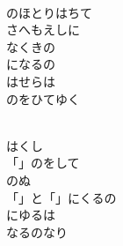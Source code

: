 \documentclass[10pt,b5j]{tarticle} %
\begin{document}
\begin{enumerate}
\begin{minipage}[c]{\blocksize}
    \end{minipage}
    \begin{minipage}[c]{\blocksize}
        
        \vspace{\linespace}
        \item~\\
        のほとりはちて\\
        さへもえしに\\
        なくきの\\
        になるの\\
        はせらは\\
        のをひてゆく
        
    \end{minipage}
    \begin{minipage}[c]{\blocksize}
        
        \vspace{\linespace}
        \item~\\
        はくし\\
        「」のをして\\
        のぬ\\
        「」と「」にくるの\\
        にゆるは\\
        なるのなり
    
    \end{minipage}
\end{enumerate} %
\end{document}
